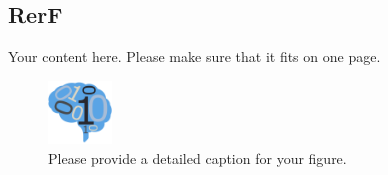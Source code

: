 \documentclass[simplex.tex]{subfiles}
\begin{document}
\subsection{RerF}


Your content here. Please make sure that it fits on one page.

\begin{figure}[!h]
\begin{cframed}
\centering
\includegraphics[width=0.15\textwidth]{neurodata_small.png}
\caption{Please provide a detailed caption for your figure.}
\label{fig:meda}
\end{cframed}
\end{figure}
\end{document}
